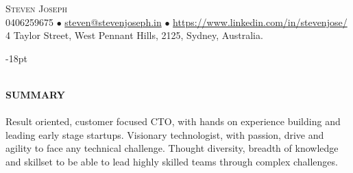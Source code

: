 \documentclass[10pt]{article}
\newcommand{\lineunder}{\vspace*{-10pt} \\ \hspace*{-18pt} \hrulefill \vspace{2pt}\\}
\newcommand{\header}[1]{{\hspace*{-15pt}\vspace*{-0pt}\\ \uppercase{\textbf {#1}}}  \lineunder}
\newcommand{\contact}[4]{
\vspace*{-19pt}
\begin{flushleft}
{\hspace*{-15pt} \Huge \scshape \scshape {#1}}\\
#2\\
#3
\newline
\end{flushleft}
}
\begin{document}
\contact{Steven Joseph}
{0406259675  $\bullet$ \href{mailto:steven@stevenjoseph.in}{steven@stevenjoseph.in} $\bullet$  \href{https://www.linkedin.com/in/stevenjose/}{https://www.linkedin.com/in/stevenjose/}}
{4 Taylor Street, West Pennant Hills, 2125, Sydney, Australia.}

\vspace{-18pt}


\header{Summary}
Result oriented, customer focused CTO, with hands on experience building and leading early stage startups.
Visionary technologist, with passion, drive and agility to face any technical challenge.
Thought diversity, breadth of knowledge and skillset to be able to lead highly skilled teams through complex challenges.
\end{document}
